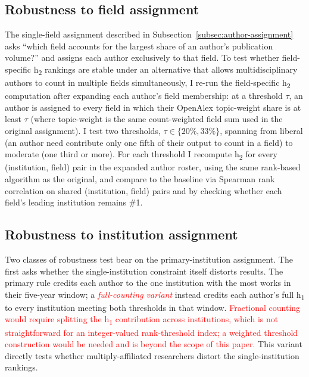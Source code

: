 \subsection{Robustness to field assignment}
\label{subsec:methods-field-robustness}
The single-field assignment described in Subsection~\ref{subsec:author-assignment} asks ``which field accounts for the largest share of an author's publication volume?'' and assigns each author exclusively to that field. To test whether field-specific h\textsubscript{2} rankings are stable under an alternative that allows multidisciplinary authors to count in multiple fields simultaneously, I re-run the field-specific h\textsubscript{2} computation after expanding each author's field membership: at a threshold $\tau$, an author is assigned to every field in which their OpenAlex topic-weight share is at least $\tau$ (where topic-weight is the same count-weighted field sum used in the original assignment). I test two thresholds, $\tau \in \{20\%, 33\%\}$, spanning from liberal (an author need contribute only one fifth of their output to count in a field) to moderate (one third or more). For each threshold I recompute h\textsubscript{2} for every (institution, field) pair in the expanded author roster, using the same rank-based algorithm as the original, and compare to the baseline via Spearman rank correlation on shared (institution, field) pairs and by checking whether each field's leading institution remains \#1.

\subsection{Robustness to institution assignment}
\label{subsec:methods-institution-robustness}
Two classes of robustness test bear on the primary-institution assignment. The first asks whether the single-institution constraint itself distorts results. The primary rule credits each author to the one institution with the most works in their five-year window; a \textcolor{red}{\textit{full-counting variant}} instead credits each author's full h\textsubscript{1} to every institution meeting both thresholds in that window. \textcolor{red}{Fractional counting would require splitting the h\textsubscript{1} contribution across institutions, which is not straightforward for an integer-valued rank-threshold index; a weighted threshold construction would be needed and is beyond the scope of this paper.} This variant directly tests whether multiply-affiliated researchers distort the single-institution rankings.

